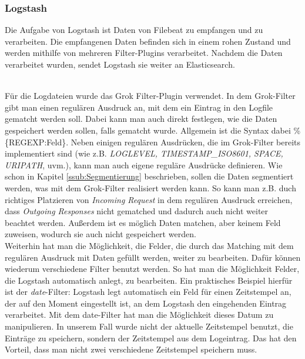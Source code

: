 \subsubsection{Logstash}
\label{sub:Logstash}
Die Aufgabe von Logstash ist Daten von Filebeat zu empfangen und zu verarbeiten. Die empfangenen Daten befinden sich in einem rohen Zustand und werden mithilfe von mehreren Filter-Plugins verarbeitet.\citep{LoFi20} Nachdem die Daten verarbeitet wurden, sendet Logstash sie weiter an Elasticsearch.

\\
Für die Logdateien wurde das Grok Filter-Plugin verwendet. In dem Grok-Filter gibt man einen regulären Ausdruck an, mit dem ein Eintrag in den Logfile gematcht werden soll. Dabei kann man auch direkt festlegen, wie die Daten gespeichert werden sollen, falls gematcht wurde. Allgemein ist die Syntax dabei \%\{REGEXP:Feld\}. Neben einigen regulären Ausdrücken, die im Grok-Filter bereits implementiert sind (wie z.B. \textit{LOGLEVEL, TIMESTAMP\_ISO8601, SPACE, URIPATH}, uvm.), kann man auch eigene reguläre Ausdrücke definieren.
Wie schon in Kapitel \ref{ssub:Segmentierung} beschrieben, sollen die Daten segmentiert werden, was mit dem Grok-Filter realisiert werden kann. So kann man z.B. duch richtiges Platzieren von \textit{Incoming Request} in dem regulären Ausdruck erreichen, dass \textit{Outgoing Responses} nicht gematched und dadurch auch nicht weiter beachtet werden. Außerdem ist es möglich Daten matchen, aber keinem Feld zuweisen, wodurch sie auch nicht gespeichert werden.\\
Weiterhin hat man die Möglichkeit, die Felder, die durch das Matching mit dem regulären Ausdruck mit Daten gefüllt werden, weiter zu bearbeiten. Dafür können wiederum verschiedene Filter benutzt werden. So hat man die Möglichkeit Felder, die Logstash automatisch anlegt, zu bearbeiten. Ein praktisches Beispiel hierfür ist der \textit{date}-Filter: Logstash legt automatisch ein Feld für einen Zeitstempel an, der auf den Moment eingestellt ist, an dem Logstash den eingehenden Eintrag verarbeitet. Mit dem date-Filter hat man die Möglichkeit dieses Datum zu manipulieren. In unserem Fall wurde nicht der aktuelle Zeitstempel benutzt, die Einträge zu speichern, sondern der Zeitstempel aus dem Logeintrag. Das hat den Vorteil, dass man nicht zwei verschiedene Zeitstempel speichern muss.

